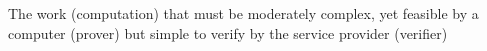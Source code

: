 The work (computation) that must be moderately complex, yet feasible by a computer (prover) but simple to verify by the service provider (verifier)